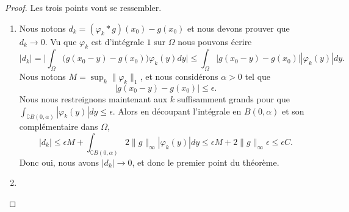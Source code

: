 \begin{proof}
    Les trois points vont se ressembler.
    \begin{enumerate}
        \item
            Nous notons \( d_k=(\varphi_k*g)(x_0)-g(x_0)\) et nous devons prouver que \( d_k\to 0\). Vu que \( \varphi_k\) est d'intégrale \( 1\) sur \( \Omega\) nous pouvons écrire
            \begin{equation}
                |d_k|=\big| \int_{\Omega}\big( g(x_0-y)-g(x_0) \big)\varphi_k(y)dy\big|\leq\int_{\Omega}\big| g(x_0-y)-g(x_0) \big| |\varphi_k(y) |dy. 
            \end{equation}
            Nous notons \( M=\sup_k\| \varphi_k \|_1\), et nous considérons \( \alpha>0\) tel que
            \begin{equation}
                \big| g(x_0-y)-g(x_0) \big|\leq \epsilon.
            \end{equation}
            Nous nous restreignons maintenant aux \( k\) suffisamment grands pour que \( \int_{\complement B(0,\alpha)}| \varphi_k(y) |dy\leq \epsilon\). Alors en découpant l'intégrale en \( B(0,\alpha)\) et son complémentaire dans \( \Omega\),
            \begin{equation}
                | d_k |\leq \epsilon M+\int_{\complement B(0,\alpha)} 2\| g \|_{\infty}| \varphi_k(y) |dy  \leq \epsilon M+2\| g \|_{\infty}\epsilon\leq \epsilon C.
            \end{equation}
            Donc oui, nous avons \( | d_k |\to 0\), et donc le premier point du théorème.

        \item


\end{enumerate}
\end{proof}
